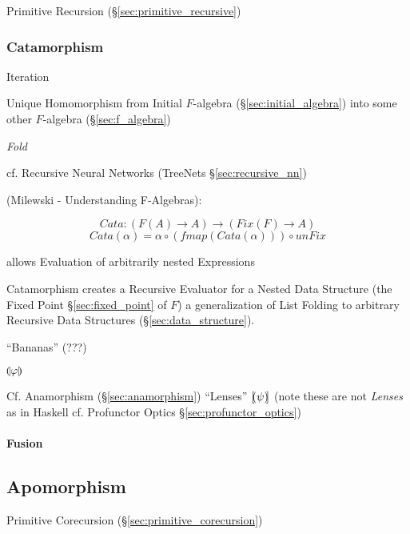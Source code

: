 Primitive Recursion (\S\ref{sec:primitive_recursive})



\subsubsection{Catamorphism}\label{sec:catamorphism}

Iteration

Unique Homomorphism from Initial $F$-algebra
(\S\ref{sec:initial_algebra}) into some other $F$-algebra
(\S\ref{sec:f_algebra})

\emph{Fold}

cf. Recursive Neural Networks (TreeNets \S\ref{sec:recursive_nn})

(Milewski - Understanding F-Algebras):

\[
  Cata : (F (A) \rightarrow A) \rightarrow (Fix (F) \rightarrow A)
\]\[
  Cata (\alpha) = \alpha \circ (fmap (Cata (\alpha))) \circ unFix
\]

allows Evaluation of arbitrarily nested Expressions

Catamorphism creates a Recursive Evaluator for a Nested Data Structure
(the Fixed Point \S\ref{sec:fixed_point} of $F$) a generalization of
List Folding to arbitrary Recursive Data Structures
(\S\ref{sec:data_structure}).

``Bananas'' (???) %

$\llparenthesis \varphi \rrparenthesis$

\fist Cf. Anamorphism (\S\ref{sec:anamorphism}) ``Lenses'' $[\kern-1.95pt(
\psi )\kern-2.0pt]$ (note these are not \emph{Lenses} as in Haskell \fist cf.
Profunctor Optics \S\ref{sec:profunctor_optics})



\paragraph{Fusion}\label{sec:fusion}\hfill



\subsection{Apomorphism}\label{sec:apomorphism}

Primitive Corecursion (\S\ref{sec:primitive_corecursion})



